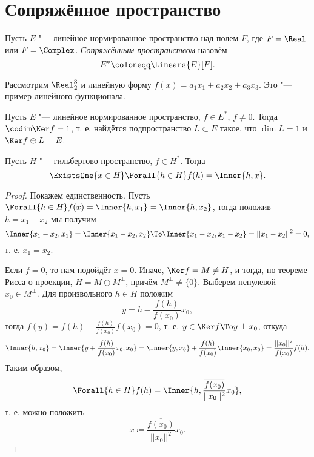 \documentclass[main]{subfiles}
\begin{document}
\section{Сопряжённое пространство} %

\begin{definition}
  Пусть \( E \) "--- линейное нормированное пространство
  над полем \( F \),
  где \( F = \Real \) или \( F = \Complex \).
  \emph{Сопряжённым пространством} назовём
  \[ E^* \coloneqq \Linears{E}[F]. \]
\end{definition}

\begin{example}
  Рассмотрим \( \Real_2^3 \) и линейную форму
  \( f(x) = a_1 x_1 + a_2 x_2 + a_3 x_3 \).
  Это "--- пример линейного функционала.
\end{example}

\begin{exercise}
  Пусть \( E \) "--- линейное нормированное пространство, \( f \in E^* \), \( f \ne 0 \).
  Тогда \( \codim \Ker f = 1 \),
  т. е. найдётся подпространство \( L \subset E \)
  такое, что \( \dim L = 1 \) и \( \Ker f \oplus L = E \).
\end{exercise}

\begin{theorem}
  Пусть \( H \) "--- гильбертово пространство,
  \( f \in H^* \). Тогда
  \[ \ExistsOne{x \in H} \Forall{h \in H} f(h) = \Inner{h, x}. \]
\end{theorem}
\begin{proof}
  Покажем единственность.
  Пусть
  \( \Forall{h \in H} f(x) = \Inner{h, x_1} = \Inner{h, x_2} \),
  тогда положив \( h = x_1 - x_2 \)
  мы получим
  \[
    \Inner{x_1 - x_2, x_1} =
    \Inner{x_1 - x_2, x_2} \To
    \Inner{x_1 - x_2, x_1 - x_2} = ||x_1 - x_2||^2 = 0,
  \]
  т. е. \( x_1 = x_2 \).

  Если \( f = 0 \), то нам подойдёт \( x = 0 \).
  Иначе, \( \Ker f = M \ne H \),
  и тогда, по теореме Рисса о проекции,
  \( H = M \oplus M^\perp \),
  причём \( M^\perp \ne \{ 0 \} \).
  Выберем ненулевой \( x_0 \in M^\perp \). Для произвольного
  \( h \in H \) положим
  \[
    y = h - \frac{f(h)}{f(x_0)} x_0,
  \]
  тогда \( f(y) = f(h) - \frac{f(h)}{f(x_0)} f(x_0) = 0 \),
  т. е. \( y \in \Ker f \To y \perp x_0 \),
  откуда
  \[
    \Inner{h, x_0} = \Inner{y + \frac{f(h)}{f(x_0)} x_0, x_0} =
    \Inner{y, x_0} + \frac{f(h)}{f(x_0)} \Inner{x_0, x_0} =
    \frac{||x_0||^2}{f(x_0)} f(h).
  \]
  Таким образом,
  \[
    \Forall{h \in H} f(h) = \Inner{h, \frac{\overline{f(x_0)}}{||x_0||^2} x_0},
  \]
  т. е. можно положить
  \[ x \coloneqq \frac{\overline{f(x_0)}}{||x_0||^2} x_0. \]
\end{proof}
\end{document}
